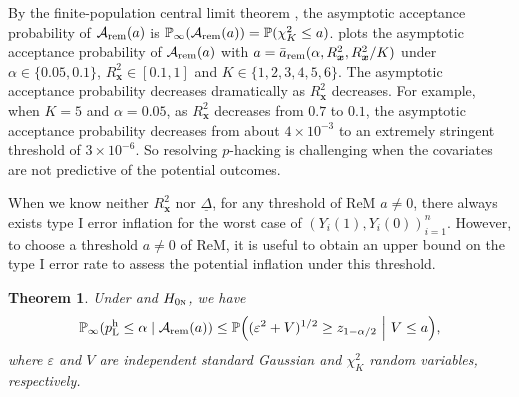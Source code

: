 \documentclass[12pt]{article}
\newtheorem{theorem}{Theorem}
\newcommand{\Prob}{\mathbb{P}}
\newcommand{\ma}{\mathcal{A}}
\newcommand{\rem}{\textnormal{rem}}
\newcommand{\bs}{\boldsymbol}
\newcommand{\hpL}{p_\textnormal{L}^{\textnormal{h}}}
\begin{document}
By the finite-population central limit theorem \citep{li2017general}, the asymptotic acceptance probability of $\ma_\rem(a)$ is $\Prob_\infty(\ma_\rem(a)) = \Prob(\chi^2_K\leq a)$.   plots the 
asymptotic acceptance probability of $\ma_\rem(a)$ with $a = \bar{a}_{\rem}(\alpha,R^2_{\bs{x}},R^2_{\bs{x}}/K)$ under $\alpha\in \{0.05,0.1\}$, $R_{\bs{x}}^2\in [0.1,1]$ and $K\in \{1,2,3,4,5,6\}$. The asymptotic acceptance probability decreases dramatically as $R^2_{\bs{x}}$ decreases. For example, when $K=5$ and $\alpha = 0.05$, as $R^2_{\bs{x}}$ decreases from $0.7$ to $0.1$, the asymptotic acceptance probability decreases from about $4\times 10^{-3}$ to an extremely stringent threshold of $3\times 10^{-6}$. So resolving $p$-hacking is challenging when the covariates are not predictive of the potential outcomes.


When we know neither $R^2_{\bs{x}}$ nor $\underline{\Delta}$, for any threshold of ReM $a\ne 0$, there always exists type I error inflation for the worst case of $(Y_i(1),Y_i(0))_{i=1}^n$. However, to choose a threshold  $a\ne 0$ of ReM, it is useful to obtain an upper bound on the type I error rate to assess the potential inflation under this threshold. 

\begin{theorem}
\label{thm:ReM-bound-of-I-error-rate-inflation}
Under  and $H_{0\textsc{n}}$, we have
    \begin{align*}
        \Prob_{\infty}( \hpL \leq \alpha\mid \ma_{\rem}(a)) \leq \Prob\Big((\varepsilon^{2}+V)^{1/2} \geq z_{1-\alpha/2}~\Big | ~ V \leq a\Big),
    \end{align*}
    where $\varepsilon$ and $V$ are independent standard Gaussian and $\chi^2_{K}$ random variables, respectively.
\end{theorem}
\end{document}
